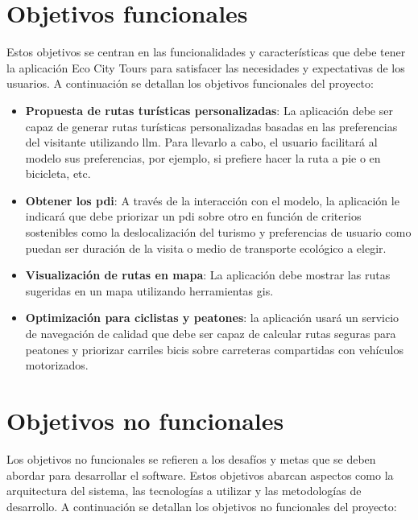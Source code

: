 
\section{Objetivos funcionales}

Estos objetivos se centran en las funcionalidades y características que debe tener la aplicación Eco City Tours para satisfacer las necesidades y expectativas de los usuarios. A continuación se detallan los objetivos funcionales del proyecto:

\begin{itemize}
    \item \textbf{Propuesta de rutas turísticas personalizadas}: La aplicación debe ser capaz de generar rutas turísticas personalizadas basadas en las preferencias del visitante utilizando \acrfull{llm}. Para llevarlo a cabo, el usuario facilitará al modelo sus preferencias, por ejemplo, si prefiere hacer la ruta a pie o en bicicleta, etc.
    \item \textbf{Obtener los \acrfull{pdi}}: A través de la interacción con el modelo, la aplicación le indicará que debe priorizar un \acrshort{pdi} sobre otro en función de criterios sostenibles como la deslocalización del turismo y preferencias de usuario como puedan ser duración de la visita o medio de transporte ecológico a elegir.
    \item \textbf{Visualización de rutas en mapa}: La aplicación debe mostrar las rutas sugeridas en un mapa utilizando herramientas \acrfull{gis}.
    \item \textbf{Optimización para ciclistas y peatones}: la aplicación usará un servicio de navegación de calidad que debe ser capaz de calcular rutas seguras para peatones y priorizar carriles bicis sobre carreteras compartidas con vehículos motorizados.

\end{itemize}

\section{Objetivos no funcionales}

Los objetivos no funcionales se refieren a los desafíos y metas que se deben abordar para desarrollar el software. Estos objetivos abarcan aspectos como la arquitectura del sistema, las tecnologías a utilizar y las metodologías de desarrollo. A continuación se detallan los objetivos no funcionales del proyecto:

